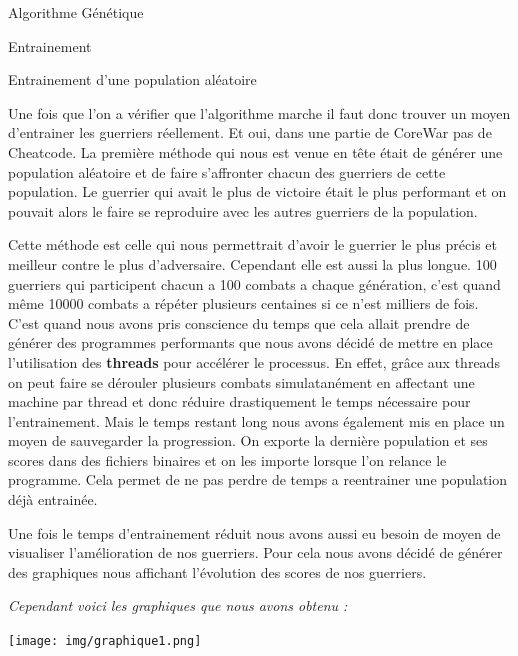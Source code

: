 \documentclass[a4paper, 10pt]{article}
\begin{document}
\begin{section}{Algorithme Génétique}
\begin{subsection}{Entrainement}
                \begin{subsubsection}{Entrainement d'une population aléatoire}
                    \par
                        Une fois que l'on a vérifier que l'algorithme marche il faut donc trouver un moyen d'entrainer les guerriers réellement. Et oui, dans une partie de CoreWar pas de Cheatcode. La première méthode qui nous est venue en tête était de générer une population aléatoire et de faire s'affronter chacun des guerriers de cette population. Le guerrier qui avait le plus de victoire était le plus performant et on pouvait alors le faire se reproduire avec les autres guerriers de la population.
                        \medskip
                    \par
                        Cette méthode est celle qui nous permettrait d'avoir le guerrier le plus précis et meilleur contre le plus d'adversaire. Cependant elle est aussi la plus longue. 100 guerriers qui participent chacun a 100 combats a chaque génération, c'est quand même 10000 combats a répéter plusieurs centaines si ce n'est milliers de fois. C'est quand nous avons pris conscience du temps que cela allait prendre de générer des programmes performants que nous avons décidé de mettre en place l'utilisation des \textbf{threads} pour accélérer le processus. En effet, grâce aux threads on peut faire se dérouler plusieurs combats simulatanément en affectant une machine par thread et donc réduire drastiquement le temps nécessaire pour l'entrainement. Mais le temps restant long nous avons également mis en place un moyen de sauvegarder la progression. On exporte la dernière population et ses scores dans des fichiers binaires et on les importe lorsque l'on relance le programme. Cela permet de ne pas perdre de temps a reentrainer une population déjà entrainée.
                        \medskip
                    \par
                        Une fois le temps d'entrainement réduit nous avons aussi eu besoin de moyen de visualiser l'amélioration de nos guerriers. Pour cela nous avons décidé de générer des graphiques nous affichant l'évolution des scores de nos guerriers.
                        \medskip
                    \par
                        \textit{Cependant voici les graphiques que nous avons obtenu :}
                        \medskip
                    \par
                        \texttt{[image: img/graphique1.png]}
                        \bigskip
                    \par

\end{subsubsection}
\end{subsection}
\end{section}
\end{document}
